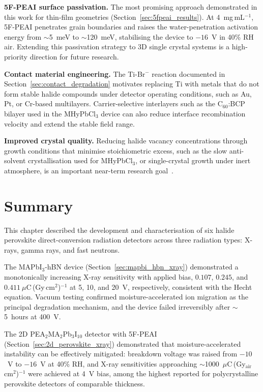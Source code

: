 \textbf{5F-PEAI surface passivation.}  The most promising
approach demonstrated in this work for thin-film geometries
(Section~\ref{sec:5fpeai_results}).  At 4~mg\,mL$^{-1}$, 5F-PEAI
penetrates grain boundaries and raises the water-penetration
activation energy from $\sim$5~meV to $\sim$120~meV, stabilising
the device to $-16$~V in 40\% RH air.  Extending this passivation
strategy to 3D single crystal systems is a high-priority
direction for future research.

\textbf{Contact material engineering.}  The Ti-Br$^-$ reaction
documented in Section~\ref{sec:contact_degradation} motivates
replacing Ti with metals that do not form stable halide compounds
under detector operating conditions, such as Au, Pt, or
Cr-based multilayers.  Carrier-selective interlayers such as the
C$_{60}$:BCP bilayer used in the MHyPbCl$_3$ device can also
reduce interface recombination velocity and extend the stable
field range.

\textbf{Improved crystal quality.}  Reducing halide vacancy
concentrations through growth conditions that minimise
stoichiometric excess, such as the slow anti-solvent
crystallisation used for MHyPbCl$_3$, or single-crystal
growth under inert atmosphere, is an important near-term research
goal~\cite{Saidaminov2015}.


\section{Summary}
\label{sec:ch5_summary}

This chapter described the development and characterisation of
six halide perovskite direct-conversion radiation detectors across
three radiation types: X-rays, gamma rays, and fast neutrons.

The MAPbI$_3$-hBN device (Section~\ref{sec:mapbi_hbn_xray})
demonstrated a monotonically increasing X-ray sensitivity with
applied bias, $0.107$, $0.245$, and
$0.411~\mu$C\,(Gy\,cm$^2$)$^{-1}$ at 5, 10, and 20~V,
respectively, consistent with the Hecht equation.  Vacuum
testing confirmed moisture-accelerated ion migration as the
principal degradation mechanism, and the device failed
irreversibly after $\sim$5~hours at 400~V.

The 2D PEA$_2$MA$_2$Pb$_3$I$_{10}$ detector with 5F-PEAI
(Section~\ref{sec:2d_perovskite_xray}) demonstrated that
moisture-accelerated instability can be effectively mitigated:
breakdown voltage was raised from $-10$~V to $-16$~V at 40\% RH,
and X-ray sensitivities approaching
$\sim$1000~$\mu$C\,(Gy$_{\mathrm{air}}$\,cm$^2$)$^{-1}$ were achieved
at 4~V bias, among the highest reported for polycrystalline
perovskite detectors of comparable thickness.

